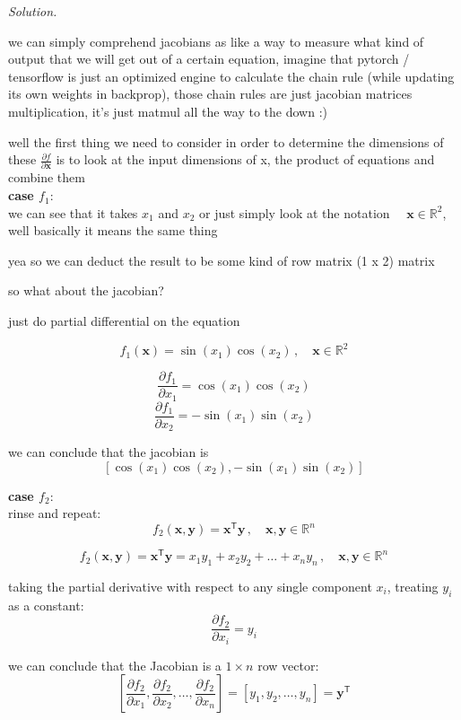 \documentclass[12pt, a4paper]{article}
\newcommand{\R}{\mathbb{R}}        %
\newcommand{\bx}{\bm{x}}           %
\newcommand{\by}{\bm{y}}           %
\newcommand{\T}{\mathsf{T}}                      %
\newenvironment{solution}{\noindent\textit{Solution.}\par\vspace{0.5em}}{\vspace{2em}}
\begin{document}
\begin{solution}
  we can simply comprehend jacobians as like a way to measure what kind of output that we will get out of a certain equation, imagine that pytorch / tensorflow is just
  an optimized engine to calculate the chain rule (while updating its own weights in backprop), those chain rules are just jacobian matrices multiplication, it's just matmul all the way to the down :)


  well the first thing we need to consider in order to determine the dimensions of these $\frac{\partial f}{\partial \bx}$ is to look at the input dimensions of x, the product of equations and combine them \\

  \textbf{case $f_1$}: \\
  we can see that it takes $x_1$ and $x_2$ or just simply look at the notation $\quad \bx \in \R^2$, well basically it means the same thing

  yea so we can deduct the result to be some kind of row matrix (1 x 2) matrix

  so what about the jacobian?

  just do partial differential on the equation
  
  \[ f_1(\bx) = \sin(x_1)\cos(x_2) \,, \quad \bx \in \R^2 \]

  \[\frac{\partial f_1}{\partial x_1} = \cos(x_1)\cos(x_2)\]
  \[\frac{\partial f_1}{\partial x_2} = -\sin(x_1)\sin(x_2)\]

  we can conclude that the jacobian is \\
  \[ [\cos(x_1)\cos(x_2), -\sin(x_1)\sin(x_2)] \]


  \textbf{case $f_2$}: \\

  rinse and repeat: \\
  \[f_2(\bx, \by) = \bx^\T \by \,, \quad \bx, \by \in \R^n \]

  \[f_2(\bx, \by) = \bx^\T \by = x_1y_1 + x_2y_2 + \dots + x_ny_n \,, \quad \bx, \by \in \R^n \]

  taking the partial derivative with respect to any single component $x_i$, treating $y_i$ as a constant: \\
  \[ \frac{\partial f_2}{\partial x_i} = y_i \]

  we can conclude that the Jacobian is a $1 \times n$ row vector: \\
  \[ \left[ \frac{\partial f_2}{\partial x_1}, \frac{\partial f_2}{\partial x_2}, \dots, \frac{\partial f_2}{\partial x_n} \right] = [y_1, y_2, \dots, y_n] = \by^\T \]



\end{solution}
\end{document}
